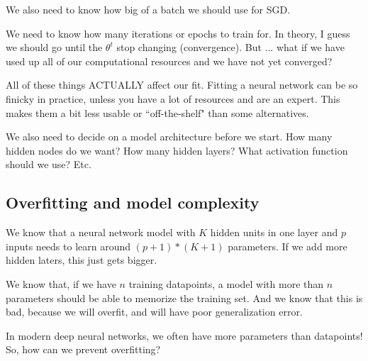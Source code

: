 We also need to know how big of a batch we should use for SGD. 

We need to know how many iterations or epochs to train for. In theory, I guess we should go until the $\theta^t$ stop changing (convergence). But ... what if we have used up all of our computational resources and we have not yet converged? 

All of these things ACTUALLY affect our fit. Fitting a neural network can be so finicky in practice, unless you have a lot of resources and are an expert. This makes them a bit less usable or ``off-the-shelf" than some alternatives. 

We also need to decide on a model architecture before we start. How many hidden nodes do we want? How many hidden layers? What activation function should we use? Etc. 

\subsection{Overfitting and model complexity}

We know that a neural network model with $K$ hidden units in one layer and $p$ inputs needs to learn around $(p+1)*(K+1)$ parameters. If we add more hidden laters, this just gets bigger.

We know that, if we have $n$ training datapoints, a model with more than $n$ parameters should be able to memorize the training set. And we know that this is bad, because we will overfit, and will have poor generalization error. 

In modern deep neural networks, we often have more parameters than datapoints! So, how can we prevent overfitting?

